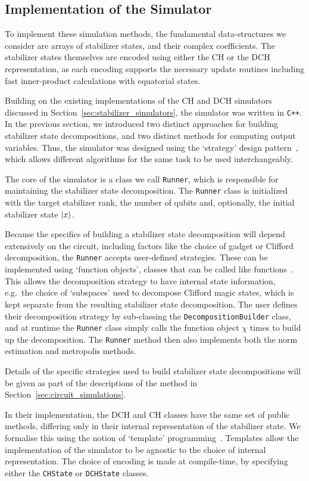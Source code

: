 \subsection{Implementation of the Simulator}\label{sec:implementing_simulator}
To implement these simulation methods, the fundamental data-structures we consider are arrays of stabilizer states, and their complex coefficients. The stabilizer states themselves are encoded using either the CH or the DCH representation, as each encoding supports the necessary update routines including fast inner-product calculations with equatorial states.\par
Building on the existing implementations of the CH and DCH simulators discussed in Section~\ref{sec:stabilizer_simulators}, the simulator was written in \texttt{C++}. In the previous section, we introduced two distinct approaches for building stabilizer state decompositions, and two distinct methods for computing output variables. Thus, the simulator was designed using the `strategy' design pattern~\cite{GoF}, which allows different algorithms for the same task to be used interchangeably.\par
The core of the simulator is a class we call \texttt{Runner}, which is responsible for maintaining the stabilizer state decomposition. The \texttt{Runner} class is initialized with the target stabilizer rank, the number of qubits and, optionally, the initial stabilizer state $\ket{x}$.\par
Because the specifics of building a stabilizer state decomposition will depend extensively on the circuit, including factors like the choice of gadget or Clifford decomposition, the \texttt{Runner} accepts user-defined strategies. These can be implemented using `function objects', classes that can be called like functions~\cite{CPPRefFunctionObject}. This allows the decomposition strategy to have internal state information, e.g.\ the choice of `subspaces' used to decompose Clifford magic states, which is kept separate from the resulting stabilizer state decomposition. The user defines their decomposition strategy by sub-classing the \texttt{DecompositionBuilder} class, and at runtime the \texttt{Runner} class simply calls the function object $\chi$ times to build up the decomposition. The \texttt{Runner} method then also implements both the norm estimation and metropolis methods.\par
Details of the specific strategies used to build stabilizer state decompositions will be given as part of the descriptions of the method in Section~\ref{sec:circuit_simulations}.\par
In their implementation, the DCH and CH classes have the same set of public methods, differing only in their internal representation of the stabilizer state. We formalise this using the notion of `template' programming~\cite{GoF,CPPRefTemplates}. Templates allow the implementation of the simulator to be agnostic to the choice of internal representation. The choice of encoding is made at compile-time, by specifying either the \texttt{CHState} or \texttt{DCHState} classes.\par
